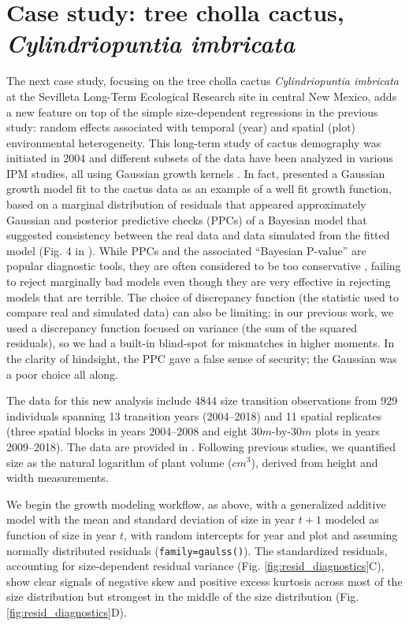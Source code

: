 \documentclass[12pt]{article}
\begin{document}
\section{Case study: tree cholla cactus, \emph{Cylindriopuntia imbricata}}
The next case study, focusing on the tree cholla cactus \emph{Cylindriopuntia imbricata} at the Sevilleta Long-Term Ecological Research site in central New Mexico, adds a new feature on top of the simple size-dependent regressions in the previous study: random effects associated with temporal (year) and spatial (plot) environmental heterogeneity. 
This long-term study of cactus demography was initiated in 2004 and different subsets of the data have been analyzed in various IPM studies, all using Gaussian growth kernels  \citep{miller2009impacts,czachurademographic,compagnoni2016effect,ohm2014balancing,elderd2016quantifying}.
In fact, \citep{elderd2016quantifying} presented a Gaussian growth model fit to the cactus data as an example of a well fit growth function, based on a marginal distribution of residuals that appeared approximately Gaussian and posterior predictive checks (PPCs) of a Bayesian model that suggested consistency between the real data and data simulated from the fitted model (Fig. 4 in \citep{elderd2016quantifying}). 
While PPCs and the associated ``Bayesian P-value'' are popular diagnostic tools, they are often considered to be too conservative \citep{conn2018guide,zhang2014comparative}, failing to reject marginally bad models even though they are very effective in rejecting models that are terrible.
The choice of discrepancy function (the statistic used to compare real and simulated data) can also be limiting: in our previous work, we used a discrepancy function focused on variance (the sum of the squared residuals), so we had a built-in blind-spot for mismatches in higher moments.
In the clarity of hindsight, the PPC gave a false sense of security; the Gaussian was a poor choice all along.

The data for this new analysis include 4844 size transition observations from 929 individuals spanning 13 transition years (2004--2018) and 11 spatial replicates (three spatial blocks in years 2004--2008 and eight $30m$-by-$30m$ plots in years 2009--2018). 
The data are provided in \cite{cactusdata}.
Following previous studies, we quantified size as the natural logarithm of plant volume ($cm^3$), derived from height and width measurements. 

We begin the growth modeling workflow, as above, with a generalized additive model with the mean and standard deviation of size in year $t+1$ modeled as function of size in year $t$, with random intercepts for year and plot and assuming normally distributed residuals (\texttt{family=gaulss()}). 
The standardized residuals, accounting for size-dependent residual variance (Fig. \ref{fig:resid_diagnostics}C), show clear signals of negative skew and positive excess kurtosis across most of the size distribution but strongest in the middle of the size distribution (Fig. \ref{fig:resid_diagnostics}D). 
\end{document}
